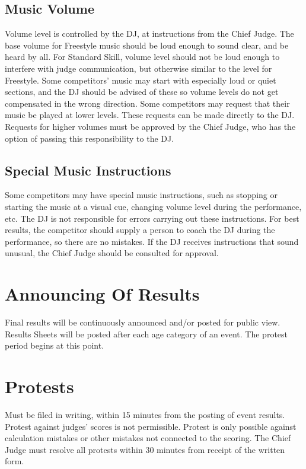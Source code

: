\subsection{Music Volume}
Volume level is controlled by the DJ, at instructions from the Chief Judge.
The base volume for Freestyle music should be loud enough to sound clear, and be heard by all.
For Standard Skill, volume level should not be loud enough to interfere with judge communication, but otherwise similar to the level for Freestyle.
Some competitors' music may start with especially loud or quiet sections, and the DJ should be advised of these so volume levels do not get compensated in the wrong direction.
Some competitors may request that their music be played at lower levels.
These requests can be made directly to the DJ.
Requests for higher volumes must be approved by the Chief Judge, who has the option of passing this responsibility to the DJ.

\subsection{Special Music Instructions}
Some competitors may have special music instructions, such as stopping or starting the music at a visual cue, changing volume level during the performance, etc.
The DJ is not responsible for errors carrying out these instructions.
For best results, the competitor should supply a person to coach the DJ during the performance, so there are no mistakes.
If the DJ receives instructions that sound unusual, the Chief Judge should be consulted for approval.

\section{Announcing Of Results}
Final results will be continuously announced and/or posted for public view.
Results Sheets will be posted after each age category of an event.
The protest period begins at this point.

\section{Protests}
Must be filed in writing, within 15 minutes from the posting of event results.
Protest against judges' scores is not permissible.
Protest is only possible against calculation mistakes or other mistakes not connected to the scoring.
The Chief Judge must resolve all protests within 30 minutes from receipt of the written form.

